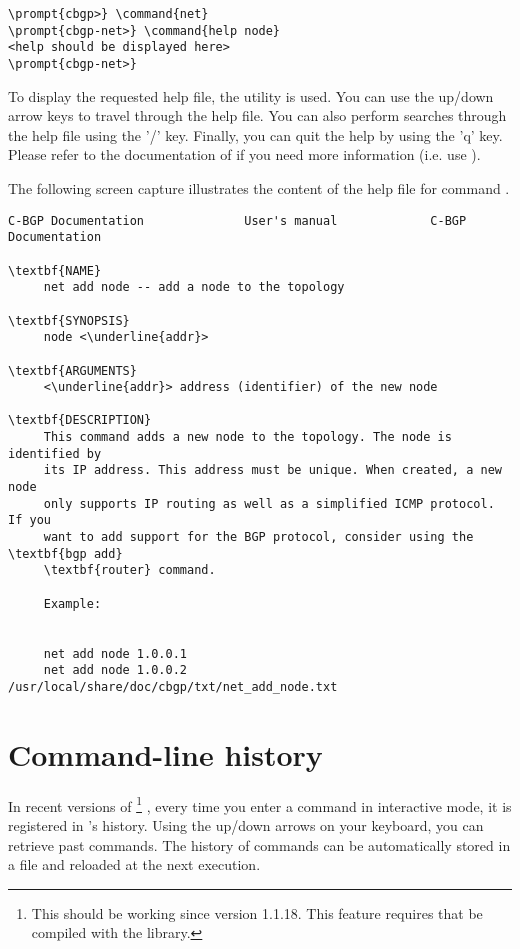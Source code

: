 \begin{Verbatim}[commandchars=\\\{\}]
\prompt{cbgp>} \command{net}
\prompt{cbgp-net>} \command{help node}
<help should be displayed here>
\prompt{cbgp-net>}
\end{Verbatim}

To display the requested help file, the  utility is
used. You can use the up/down arrow keys to travel through the help
file. You can also perform searches through the help file using the
'/' key. Finally, you can quit the help by using the 'q' key. Please
refer to the documentation of  if you need more
information (i.e. use ).

The following screen capture illustrates the content of the help file
for command .

\begin{Verbatim}[commandchars=\\\{\},fontsize=\small,frame=single]
C-BGP Documentation              User's manual             C-BGP Documentation

\textbf{NAME}
     net add node -- add a node to the topology

\textbf{SYNOPSIS}
     node <\underline{addr}>

\textbf{ARGUMENTS}
     <\underline{addr}> address (identifier) of the new node

\textbf{DESCRIPTION}
     This command adds a new node to the topology. The node is identified by
     its IP address. This address must be unique. When created, a new node
     only supports IP routing as well as a simplified ICMP protocol. If you
     want to add support for the BGP protocol, consider using the \textbf{bgp add}
     \textbf{router} command.

     Example:


     net add node 1.0.0.1
     net add node 1.0.0.2
/usr/local/share/doc/cbgp/txt/net_add_node.txt 
\end{Verbatim}

\section{Command-line history}
\label{sec:user-interface-history}

In recent versions of \footnote{This should be
  working since version 1.1.18. This feature requires that
   be compiled with the 
  library.}
, every time you enter a command in
interactive mode, it is registered in 's
history. Using the up/down arrows on your keyboard, you can retrieve
past commands. The history of commands can be automatically stored in
a file and reloaded at the next execution.

